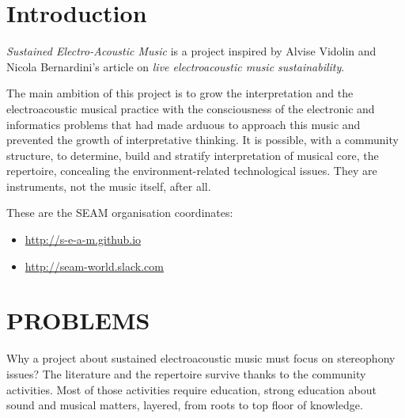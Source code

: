 \documentclass{article}
\title{\papertitle}
\begin{document}
%
\capstartfalse
\maketitle
\capstarttrue
%
\begin{abstract}

\end{abstract}
%

\section{Introduction}
\label{sec:introduction}

\emph{Sustained Electro-Acoustic Music} is a project inspired by Alvise Vidolin
and Nicola Bernardini's article \cite{bevi05} on \emph{live electroacoustic
music sustainability}.

The main ambition of this project is to grow the interpretation and the
electroacoustic musical practice with the consciousness of the electronic
and informatics problems that had made arduous to approach this music and
prevented the growth of interpretative thinking. It is possible, with a
community structure, to determine, build and stratify interpretation of musical
core, the repertoire, concealing the environment-related technological issues.
They are instruments, not the music itself, after all.

These are the SEAM organisation coordinates:
\begin{itemize}
\item \url{http://s-e-a-m.github.io}
\item \url{http://seam-world.slack.com}
\end{itemize}

\vfill\null

\newpage

\section{PROBLEMS}
\label{sec:problems}

Why a project about sustained electroacoustic music must focus on stereophony issues? The literature and the repertoire survive thanks to the community activities. Most of those activities require education, strong education about sound and musical matters, layered, from roots to top floor of knowledge.
\end{document}
